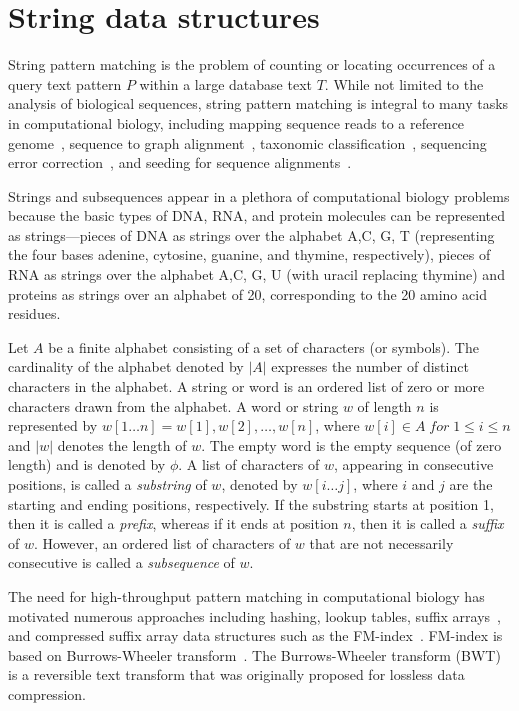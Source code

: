\section{String data structures}

String pattern matching is the problem of counting or locating occurrences of a query text pattern $P$ within a large database text $T$. While not limited to the analysis of biological sequences, string pattern matching is integral to many tasks in computational biology, including mapping sequence reads to a reference genome~\cite{li2009fast,langmead2009ultrafast}, sequence to graph alignment~\cite{Jain2020}, taxonomic classification~\cite{menzel2016fast,kim2016centrifuge}, sequencing error correction~\cite{huang2017efficient}, and seeding for sequence alignments~\cite{buchfink2015fast,altschul1990basic,steinegger2017mmseqs2}.

Strings and subsequences appear in a plethora of computational biology problems because the basic types of DNA, RNA, and protein molecules can be represented as strings—pieces of DNA as strings over the alphabet {A,C, G, T } (representing the four bases adenine, cytosine, guanine, and thymine, respectively), pieces of RNA as strings over the alphabet {A,C, G, U} (with uracil replacing thymine) and proteins as strings over an alphabet of 20, corresponding to the 20 amino acid residues.


Let $A$ be a finite alphabet consisting of a set of characters (or symbols).  The cardinality of the alphabet denoted by $|A|$ expresses the number of distinct characters in the alphabet.  A string or word is an ordered list of zero or more characters drawn from the alphabet. A word or string $w$ of length $n$ is represented by $w[1 \ldots n] = w[1],w[2], \ldots ,w[n]$, where $w[i] \in A \; for \; 1 \leq i \leq n$ and $|w|$ denotes the length of $w$. The empty word is the empty sequence (of zero length) and is denoted by $\phi$. 
A list of characters of $w$, appearing in consecutive positions, is called a \emph{substring} of $w$, denoted by $w[i \ldots j]$, where $i$ and $j$ are the starting and ending positions, respectively. 
If the substring starts at position 1, then it is called a \emph{prefix}, whereas if it ends at position $n$, then it is called a \emph{suffix} of $w$. However, an ordered list of characters of $w$ that are not necessarily consecutive is called a \emph{subsequence} of $w$.

The need for high-throughput pattern matching in computational biology has motivated numerous approaches including hashing, lookup tables, suffix arrays~\cite{manber1993suffix}, and compressed suffix array data structures such as the FM-index~\cite{ferragina2000opportunistic}. 
FM-index is based on Burrows-Wheeler transform~\cite{burrows1994block}. The Burrows-Wheeler transform (BWT) is a reversible text transform that was originally proposed for lossless data compression.

